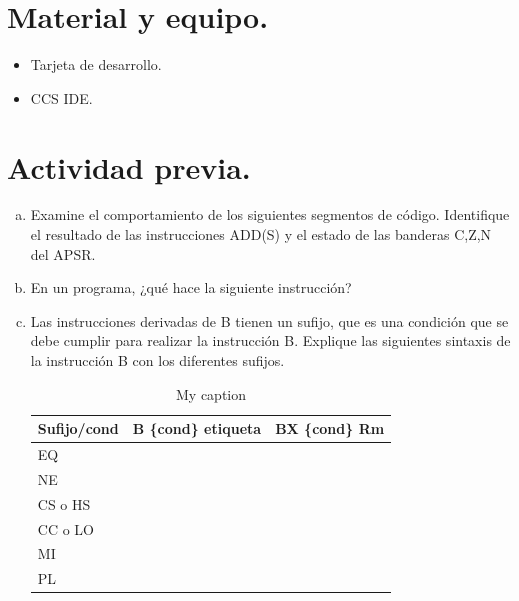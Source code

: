 \documentclass[a4paper,11pt]{article}                 %
\begin{document}
\section{Material y equipo.}
 
\begin{itemize}
	\item Tarjeta de desarrollo.
	\item CCS IDE. 
\end{itemize}
  

  
\section{Actividad previa.}                   
  
  \begin{enumerate}[a)]
  	\item Examine el comportamiento de los siguientes segmentos de código. Identifique el resultado de las instrucciones ADD(S) y el estado de las banderas C,Z,N del APSR. 
  	
  	\item  En un programa, ¿qué hace la siguiente instrucción?
  	
  	\item  Las instrucciones derivadas de B tienen un sufijo, que es una condición que se debe cumplir para realizar la instrucción B. Explique las siguientes sintaxis de la instrucción B con los diferentes sufijos. 
  	
  	\begin{table}[H]
  		\begin{tabular}{|l |l|l|}
  			\hline
  			Sufijo/cond & B \{cond\} etiqueta & BX \{cond\} Rm \\ \hline
  			EQ          &                     &                \\ \hline
  			NE          &                     &                \\ \hline
  			CS o HS     &                     &                \\ \hline
  			CC o LO     &                     &                \\ \hline
  			MI          &                     &                \\ \hline
  			PL          &                     &                \\ \hline
  		\end{tabular}
  	\centering
  	\caption{My caption}
  	\label{my-label}
  	\end{table}
  	

\end{enumerate}
\end{document}
